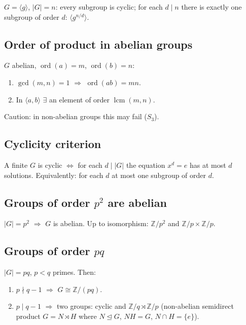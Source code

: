 $G=\langle g\rangle$, $|G|=n$: every subgroup is cyclic; for each $d\mid n$ there is exactly one subgroup of order $d$: $\langle g^{n/d}\rangle$.

\subsection{Order of product in abelian groups}
\label{subsec:order-product-abelian}

$G$ abelian, $\operatorname{ord}(a)=m$, $\operatorname{ord}(b)=n$:
\begin{enumerate}
\item $\gcd(m,n)=1$ $\Rightarrow$ $\operatorname{ord}(ab)=mn$.
\item In $\langle a,b\rangle$ $\exists$ an element of order $\operatorname{lcm}(m,n)$.
\end{enumerate}
Caution: in non-abelian groups this may fail ($S_3$).

\subsection{Cyclicity criterion}
\label{subsec:cyclicity-criterion}

A finite $G$ is cyclic $\Leftrightarrow$ for each $d\mid|G|$ the equation $x^d=e$ has at most $d$ solutions. Equivalently: for each $d$ at most one subgroup of order $d$.

\subsection{Groups of order $p^2$ are abelian}
\label{subsec:order-p2}

$|G|=p^2$ $\Rightarrow$ $G$ is abelian. Up to isomorphism: $\mathbb{Z}/p^2$ and $\mathbb{Z}/p\times\mathbb{Z}/p$.

\subsection{Groups of order $pq$}
\label{subsec:order-pq}

$|G|=pq$, $p<q$ primes. Then:
\begin{enumerate}
\item $p\nmid q-1$ $\Rightarrow$ $G\cong\mathbb{Z}/(pq)$.
\item $p\mid q-1$ $\Rightarrow$ two groups: cyclic and $\mathbb{Z}/q\rtimes\mathbb{Z}/p$ (non-abelian semidirect product $G=N\rtimes H$ where $N\trianglelefteq G$, $NH=G$, $N\cap H=\{e\}$).
\end{enumerate}

